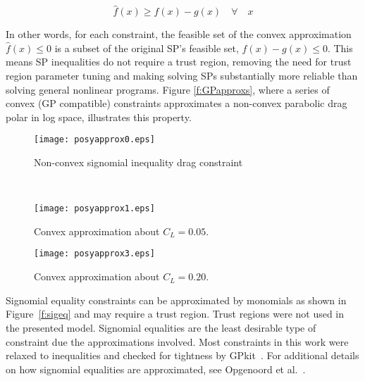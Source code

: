 \begin{equation}
\hat{f}(x) \geq f(x) - g(x) \quad \forall \quad x
\end{equation}

In other words, for each constraint, the feasible set of the convex
approximation $\hat{f}(x) \leq 0$ is a subset of the original SP's feasible set,
$f(x) - g(x) \leq 0$. This means SP inequalities do not require a trust region,
removing the need for trust region parameter tuning and making solving SPs
substantially more reliable than solving general nonlinear programs. Figure
\ref{f:GPapproxs}, where a series of convex (GP compatible) constraints
approximates a non-convex parabolic drag polar in log space, illustrates this
property.

\begin{figure*}[t!]
    \centering
    \begin{subfigure}[t]{0.5\linewidth}
        \centering
        \texttt{[image: posyapprox0.eps]}
        \caption{Non-convex signomial inequality drag constraint}
    \end{subfigure}%
    ~
    \begin{subfigure}[t]{0.5\linewidth}
        \centering
        \texttt{[image: posyapprox1.eps]}
        \caption{Convex approximation about $C_{L} = 0.05$.}
    \end{subfigure}
    \begin{subfigure}[b]{0.5\linewidth}
        \centering
        \texttt{[image: posyapprox3.eps]}
        \caption{Convex approximation about $C_{L} = 0.20.$}
    \end{subfigure}
    \caption{A signomial inequality constraint and GP approximations about two
different points.}
    \label{f:GPapproxs}
\end{figure*}


Signomial equality constraints can be approximated by monomials as shown in
Figure~\ref{f:sigeq} and may require a trust region. Trust regions were not
used in the presented model. Signomial equalities are the least desirable type
of constraint due the approximations involved. Most constraints in this work
were relaxed to inequalities and checked for tightness by GPkit~\cite{gpkit}. For
additional details on how signomial equalities are approximated, see Opgenoord
et al.~\cite{sigeqpaper}.

